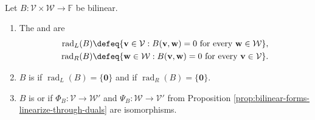 \begin{definition} \label{def:bilinear-left-right-radicals} \\
Let $B:\mathcal{V}\times\mathcal{W}\to\mathbb{F}$ be bilinear.
\begin{enumerate}[label=(\roman*)]
\setlength{\itemsep}{0pt}
\item The  and  are
\[
\begin{aligned}
\operatorname{rad}_{L}(B)&\defeq\{\mathbf{v}\in\mathcal{V}:B(\mathbf{v},\mathbf{w})=0 \text{ for every } \mathbf{w}\in\mathcal{W}\},\\
\operatorname{rad}_{R}(B)&\defeq\{\mathbf{w}\in\mathcal{W}:B(\mathbf{v},\mathbf{w})=0 \text{ for every } \mathbf{v}\in\mathcal{V}\}.
\end{aligned}
\]
\item $B$ is  if $\operatorname{rad}_{L}(B)=\{\mathbf{0}\}$ and  if $\operatorname{rad}_{R}(B)=\{\mathbf{0}\}$.
\item $B$ is  or  if $\Phi_B:\mathcal{V}\to\mathcal{W}'$ and $\Psi_B:\mathcal{W}\to\mathcal{V}'$ from Proposition \ref{prop:bilinear-forms-linearize-through-duals} are isomorphisms.
\end{enumerate}
\end{definition}

